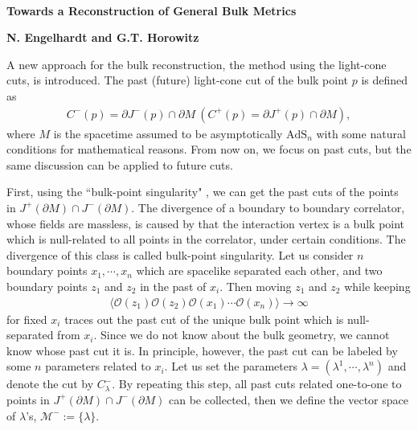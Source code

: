 \documentclass[12pt]{article}
\date{}
\begin{document}
{\Large{}\\[2mm]
\textbf{Towards a Reconstruction of General Bulk Metrics\cite{Engelhardt:2016wgb}
}
}

\noindent
\hfill
\textbf{N. Engelhardt and G.T. Horowitz}%

\vspace{12pt}
A new approach for the bulk reconstruction, the method using the light-cone cuts, is introduced.
The past (future) light-cone cut of the bulk point $p$ is defined as
\begin{align}
	C^-(p) = \partial J^-(p)\cap \partial M~(C^+(p) = \partial J^+(p)\cap \partial M),
\end{align}
where $M$ is the spacetime assumed to be asymptotically $\mathrm{AdS}_n$ with some natural conditions for mathematical reasons.
From now on, we focus on past cuts, but the same discussion can be applied to future cuts.

First, using the ``bulk-point singularity" \cite{Maldacena:2015iua}, we can get the past cuts of the points in $J^+(\partial M)\cap J^-(\partial M)$.
The divergence of a boundary to boundary correlator, whose fields are massless, is caused by that the interaction vertex is a bulk point which is null-related to all points in the correlator, under certain conditions.
The divergence of this class is called bulk-point singularity.
Let us consider $n$ boundary points $x_1,\cdots,x_n$ which are spacelike separated each other, and two boundary points $z_1$ and $z_2$ in the past of $x_i$.
Then moving $z_1$ and $z_2$ while keeping
\begin{align}
	\langle\mathcal O(z_1)\mathcal O(z_2)\mathcal O(x_1)\cdots\mathcal O(x_n)\rangle\to\infty
\end{align}
for fixed $x_i$ traces out the past cut of the unique bulk point which is null-separated from $x_i$.
Since we do not know about the bulk geometry, we cannot know whose past cut it is.
In principle, however, the past cut can be labeled by some $n$ parameters related to $x_i$.
Let us set the parameters $\lambda = (\lambda^1,\cdots,\lambda^n)$ and denote the cut by $C^-_\lambda$.
By repeating this step, all past cuts related one-to-one to points in $J^+(\partial M)\cap J^-(\partial M)$ can be collected, then we define the vector space of $\lambda$'s, $\mathcal M^- := \{\lambda\}$.
\end{document}
